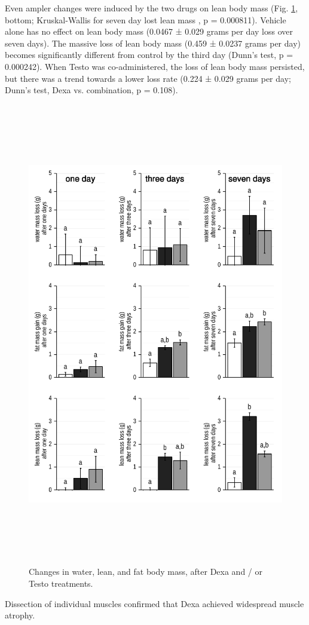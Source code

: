 \documentclass[12pt,english]{report}\usepackage[]{graphicx}\usepackage[]{color}
\newenvironment{knitrout}{}{} %
\begin{document}
Even ampler changes were induced by the two drugs on lean body mass
(Fig. \ref{fig:Changes-in-water,}, bottom; Kruskal-Wallis for seven
day lost lean mass , p = 0.000811).
Vehicle alone has no effect on lean body mass (0.0467
± 0.029
grams per day loss over seven days). The massive loss of lean body
mass (0.459
± 0.0237
grams per day) becomes significantly different from control by the
third day (Dunn's test, p = 0.000242).
When Testo was co-administered, the loss of lean body mass persisted,
but there was a trend towards a lower loss rate{ (}0.224
± 0.029
grams per day; Dunn's test, Dexa vs. combination, p = 0.108).

\begin{figure}
\begin{knitrout}
\color{fgcolor}
\includegraphics[width=6in,height=8in]{figure/unnamed-chunk-3-1} 

\end{knitrout}

\protect\caption{Changes in water, lean, and fat body mass, after Dexa and / or Testo
treatments.\label{fig:Changes-in-water,}}
\end{figure}
Dissection of individual muscles confirmed that Dexa achieved widespread
muscle atrophy.\pagebreak{}
\end{document}
